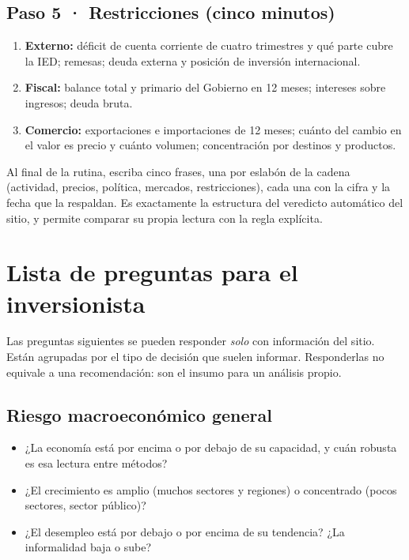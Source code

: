 \section{Paso 5 · Restricciones (cinco minutos)}
\begin{enumerate}
\item \textbf{Externo:} déficit de cuenta corriente de cuatro trimestres y qué parte cubre la IED; remesas; deuda
  externa y posición de inversión internacional.
\item \textbf{Fiscal:} balance total y primario del Gobierno en 12 meses; intereses sobre ingresos; deuda bruta.
\item \textbf{Comercio:} exportaciones e importaciones de 12 meses; cuánto del cambio en el valor es precio y cuánto
  volumen; concentración por destinos y productos.
\end{enumerate}

\begin{dato}
Al final de la rutina, escriba cinco frases, una por eslabón de la cadena (actividad, precios, política, mercados,
restricciones), cada una con la cifra y la fecha que la respaldan. Es exactamente la estructura del veredicto
automático del sitio, y permite comparar su propia lectura con la regla explícita.
\end{dato}

\chapter{Lista de preguntas para el inversionista}
\label{es:i:preguntas}

Las preguntas siguientes se pueden responder \emph{solo} con información del sitio. Están agrupadas por el tipo de
decisión que suelen informar. Responderlas no equivale a una recomendación: son el insumo para un análisis propio.

\section{Riesgo macroeconómico general}
\begin{itemize}
\item ¿La economía está por encima o por debajo de su capacidad, y cuán robusta es esa lectura entre métodos?
\item ¿El crecimiento es amplio (muchos sectores y regiones) o concentrado (pocos sectores, sector público)?
\item ¿El desempleo está por debajo o por encima de su tendencia? ¿La informalidad baja o sube?
\end{itemize}


